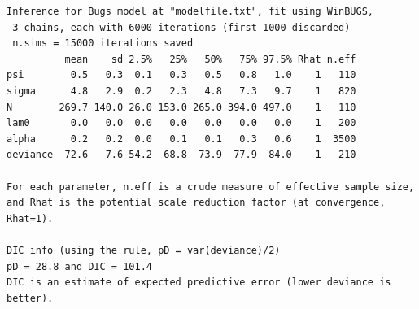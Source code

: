 {\small
\begin{verbatim}
Inference for Bugs model at "modelfile.txt", fit using WinBUGS,
 3 chains, each with 6000 iterations (first 1000 discarded)
 n.sims = 15000 iterations saved
          mean    sd 2.5%   25%   50%   75% 97.5% Rhat n.eff
psi        0.5   0.3  0.1   0.3   0.5   0.8   1.0    1   110
sigma      4.8   2.9  0.2   2.3   4.8   7.3   9.7    1   820
N        269.7 140.0 26.0 153.0 265.0 394.0 497.0    1   110
lam0       0.0   0.0  0.0   0.0   0.0   0.0   0.0    1   200
alpha      0.2   0.2  0.0   0.1   0.1   0.3   0.6    1  3500
deviance  72.6   7.6 54.2  68.8  73.9  77.9  84.0    1   210

For each parameter, n.eff is a crude measure of effective sample size,
and Rhat is the potential scale reduction factor (at convergence, Rhat=1).

DIC info (using the rule, pD = var(deviance)/2)
pD = 28.8 and DIC = 101.4
DIC is an estimate of expected predictive error (lower deviance is better).
\end{verbatim}
}



